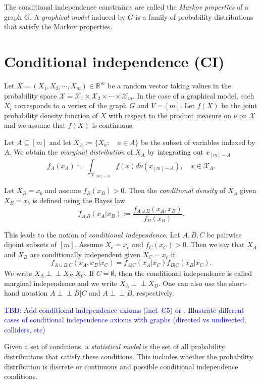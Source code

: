 \documentclass[10pt,a4paper]{article}
\newcommand{\indep}{\perp \!\!\! \perp}
\begin{document}
The conditional independence constraints are called the \emph{Markov properties} of a graph $G$. A \emph{graphical model} induced by $G$ is a family of probability distributions that satisfy the Markov properties.

\section{Conditional independence (CI)}\label{sec: CI}
Let $X=(X_1,X_2,\cdots,X_m)\in \mathbb{R}^m$ be a random vector taking values in the probability space $\mathcal{X}=\mathcal{X}_1\times\mathcal{X}_2\times\cdots\times\mathcal{X}_m$. In the case of a graphical model, each $X_i$ corresponds to a vertex of the graph $G$ and $V=[m]$. Let $f(X)$ be the joint probability density function of $X$ with respect to the product measure on $\nu$ on $\mathcal{X}$ and we assume that $f(X)$ is continuous.  

Let $A \subseteq [m]$ and let $X_A:=\{X_a:\quad a \in A\}$ be the subset of variables indexed by $A$. We obtain the \emph{marginal distribution} of $X_A$ by integrating out $x_{[m]-A}$
\[f_A(x_A):=\int_{\mathcal{X}_{[m]-A}} f(x)d\nu(x_{[m]-A}),\quad x \in \mathcal{X}_A.\]

Let $X_B=x_b$ and assume $f_B(x_B)>0$. Then the \emph{conditional density} of $X_A$ given $X_B=x_b$ is defined using the Bayes law
\[f_{A|B}(x_A|x_B):=\frac{f_{A\cup B}(x_A,x_B)}{f_B(x_B)}.\]

This leads to the notion of \emph{conditional independence}. Let $A,B,C$ be pairwise dijoint subsets of $[m]$. Assume $X_c=x_c$ and $f_C(x_C)>0$. Then we say that $X_A$ and $X_B$ are conditionally independent given $X_C=x_c$ if
\[f_{A\cup B|C}(x_A,x_B|x_C)=f_{A|C}(x_A|x_C)f_{B|C}(x_B|x_C).\]
We write $X_A\indep X_B|X_C$. If $C=\emptyset$, then the conditional independence is called marginal independence and we write $X_A\indep X_B$. One can also use the short-hand notation $A \indep B |C$ and $A \indep B$, respectively.

\textcolor{blue}{TBD: Add conditional independence axioms (incl. C5) \cite[p. 29]{lauritzen1996graphical} or \cite[Proposition 3.1.2 and Proposition 3.1.3]{drton2008lectures}. Illustrate different cases of conditional independence axioms with graphs (directed vs undirected, colliders, etc)}

Given a set of conditions, a \emph{statistical model} is the set of all probability distributions that satisfy these conditions. This includes whether the probability distribution is discrete or continuous and possible conditional independence conditions.
\end{document}
